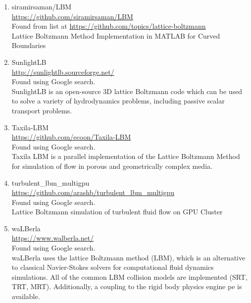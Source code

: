\documentclass{article}
\begin{document}
\begin{enumerate}
	\item siramirsaman/LBM
	\\
	\href{https://github.com/siramirsaman/LBM}{https://github.com/siramirsaman/LBM}
	\\
	Found from list at \href{https://github.com/topics/lattice-boltzmann}{https://github.com/topics/lattice-boltzmann}\\
	Lattice Boltzmann Method Implementation in MATLAB for Curved Boundaries
	
	\item SunlightLB \\
	\href{http://sunlightlb.sourceforge.net/}{http://sunlightlb.sourceforge.net/}
	\\
	Found using Google search.\\
	SunlightLB is an open-source 3D lattice Boltzmann code which can be used to solve a variety of hydrodynamics problems, including passive scalar transport problems.
	
	\item Taxila-LBM
	\\
	\href{https://github.com/ecoon/Taxila-LBM}{https://github.com/ecoon/Taxila-LBM}
	\\
	Found using Google search.\\
	Taxila LBM is a parallel implementation of the Lattice Boltzmann Method for simulation of flow in porous and geometrically complex media.
	
	\item turbulent\_lbm\_multigpu
	\\
	\href{https://github.com/arashb/turbulent_lbm_multigpu}{https://github.com/arashb/turbulent\_lbm\_multigpu}
	\\
	Found using Google search.\\
	Lattice Boltzmann simulation of turbulent fluid flow on GPU Cluster
	
	\item waLBerla
	\\
	\href{https://www.walberla.net/}{https://www.walberla.net/}
	\\
	Found using Google search.\\
	waLBerla uses the lattice Boltzmann method (LBM), which is an alternative to classical Navier-Stokes solvers for computational fluid dynamics simulations. All of the common LBM collision models are implemented (SRT, TRT, MRT). Additionally, a coupling to the rigid body physics engine pe is available. 
	

\end{enumerate}
\end{document}
